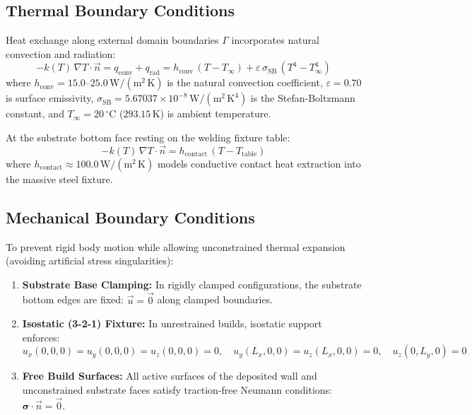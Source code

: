 \documentclass[10pt,a4paper]{article}
\begin{document}
\subsection{Thermal Boundary Conditions}
Heat exchange along external domain boundaries $\Gamma$ incorporates natural convection and radiation:
\begin{equation}
-k(T)\,\nabla T \cdot \vec{n} = q_{\mathrm{conv}} + q_{\mathrm{rad}} = h_{\mathrm{conv}}\,(T - T_\infty) + \varepsilon\,\sigma_{\mathrm{SB}}\,(T^4 - T_\infty^4)
\end{equation}
where $h_{\mathrm{conv}} = 15.0\text{--}25.0\,\mathrm{W/(m^2\,K)}$ is the natural convection coefficient, $\varepsilon = 0.70$ is surface emissivity, $\sigma_{\mathrm{SB}} = 5.67037\times 10^{-8}\,\mathrm{W/(m^2\,K^4)}$ is the Stefan-Boltzmann constant, and $T_\infty = 20\,^\circ\mathrm{C}$ ($293.15\,\mathrm{K}$) is ambient temperature.

At the substrate bottom face resting on the welding fixture table:
\begin{equation}
-k(T)\,\nabla T \cdot \vec{n} = h_{\mathrm{contact}}\,(T - T_{\mathrm{table}})
\end{equation}
where $h_{\mathrm{contact}} \approx 100.0\,\mathrm{W/(m^2\,K)}$ models conductive contact heat extraction into the massive steel fixture.

\subsection{Mechanical Boundary Conditions}
To prevent rigid body motion while allowing unconstrained thermal expansion (avoiding artificial stress singularities):
\begin{enumerate}
    \item \textbf{Substrate Base Clamping:} In rigidly clamped configurations, the substrate bottom edges are fixed: $\vec{u} = \vec{0}$ along clamped boundaries.
    \item \textbf{Isostatic (3-2-1) Fixture:} In unrestrained builds, isostatic support enforces:
    \begin{equation}
    u_x(0,0,0) = u_y(0,0,0) = u_z(0,0,0) = 0, \quad u_y(L_x,0,0) = u_z(L_x,0,0) = 0, \quad u_z(0,L_y,0) = 0
    \end{equation}
    \item \textbf{Free Build Surfaces:} All active surfaces of the deposited wall and unconstrained substrate faces satisfy traction-free Neumann conditions: $\boldsymbol{\sigma} \cdot \vec{n} = \vec{0}$.
\end{enumerate}
\end{document}
